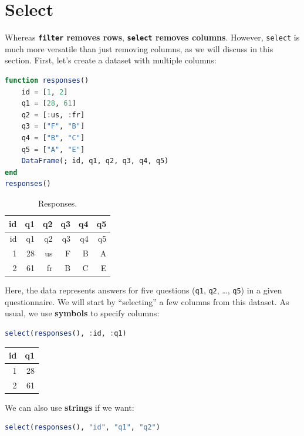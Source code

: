 \documentclass[
  notoc %
]{tufte-book}
\newcommand{\passthrough}[1]{#1}
\begin{document}
\hypertarget{sec:select}{%
\section{Select}\label{sec:select}}

Whereas \textbf{\passthrough{\lstinline!filter!} removes rows},
\textbf{\passthrough{\lstinline!select!} removes columns}. However,
\passthrough{\lstinline!select!} is much more versatile than just
removing columns, as we will discuss in this section. First, let's
create a dataset with multiple columns:

\begin{lstlisting}[language=Julia]
function responses()
    id = [1, 2]
    q1 = [28, 61]
    q2 = [:us, :fr]
    q3 = ["F", "B"]
    q4 = ["B", "C"]
    q5 = ["A", "E"]
    DataFrame(; id, q1, q2, q3, q4, q5)
end
responses()
\end{lstlisting}

\hypertarget{tbl:responses}{}
\begin{longtable}[]{@{}rrrrrr@{}}
\caption{\label{tbl:responses}Responses.}\tabularnewline
\toprule()
id & q1 & q2 & q3 & q4 & q5 \\
\midrule()
\endfirsthead
\toprule()
id & q1 & q2 & q3 & q4 & q5 \\
\midrule()
\endhead
1 & 28 & us & F & B & A \\
2 & 61 & fr & B & C & E \\
\bottomrule()
\end{longtable}

Here, the data represents answers for five questions
(\passthrough{\lstinline!q1!}, \passthrough{\lstinline!q2!}, \ldots,
\passthrough{\lstinline!q5!}) in a given questionnaire. We will start by
``selecting'' a few columns from this dataset. As usual, we use
\textbf{symbols} to specify columns:

\begin{lstlisting}[language=Julia]
select(responses(), :id, :q1)
\end{lstlisting}

\begin{longtable}[]{@{}rr@{}}
\toprule()
id & q1 \\
\midrule()
\endhead
1 & 28 \\
2 & 61 \\
\bottomrule()
\end{longtable}

We can also use \textbf{strings} if we want:

\begin{lstlisting}[language=Julia]
select(responses(), "id", "q1", "q2")
\end{lstlisting}
\end{document}
